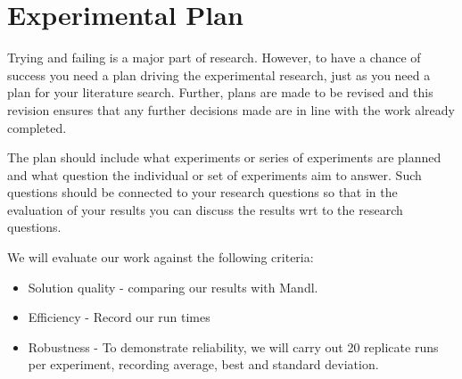 \section{Experimental Plan}

Trying and failing is a major part of research. However, to have a chance of success you need a plan driving the experimental research, just as you need a plan for your literature search. Further, plans are made to be revised and this revision ensures that any further decisions made are in line with the work already completed.  

The plan should include what experiments or series of experiments are planned and what question the individual or set of experiments aim to answer. Such questions should be connected to your research questions so that in the evaluation of your results you can discuss the results wrt to the research questions.  

We will evaluate our work against the following criteria: 
\begin{itemize}
	\item Solution quality - comparing our results with Mandl.
	\item Efficiency -  Record our run times
	\item Robustness - To demonstrate reliability, we will carry out 20 replicate runs per experiment, recording average, best and standard deviation. 
\end{itemize}

